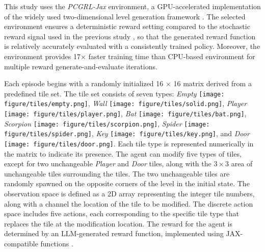
This study uses the \textit{PCGRL-Jax} \cite{earle2024scaling} environment, a GPU-accelerated implementation of the widely used two-dimensional level generation framework \cite{khalifa2020pcgrl,earle2021learning}.
The selected environment ensures a deterministic reward setting compared to the stochastic reward signal used in the previous study \cite{baek2024chatpcg}, so that the generated reward function is relatively accurately evaluated with a consistently trained policy.
Moreover, the environment provides 17$\times$ faster training time than CPU-based environment for multiple reward generate-and-evaluate iterations.

Each episode begins with a randomly initialized 16 $\times{}$ 16 matrix derived from a predefined tile set. The tile set consists of seven types: \textit{Empty} \texttt{[image: figure/tiles/empty.png]}, \textit{Wall} \texttt{[image: figure/tiles/solid.png]}, \textit{Player} \texttt{[image: figure/tiles/player.png]}, \textit{Bat} \texttt{[image: figure/tiles/bat.png]}, \textit{Scorpion} \texttt{[image: figure/tiles/scorpion.png]}, \textit{Spider} \texttt{[image: figure/tiles/spider.png]}, \textit{Key} \texttt{[image: figure/tiles/key.png]}, and \textit{Door} \texttt{[image: figure/tiles/door.png]}. Each tile type is represented numerically in the matrix to indicate its presence.
The agent can modify five types of tiles, except for two unchangeable \textit{Player} and \textit{Door} tiles, along with the $3 \times 3$ area of unchangeable tiles surrounding the tiles.
The two unchangeable tiles are randomly spawned on the opposite corners of the level in the initial state.
The observation space is defined as a 2D array representing the integer tile numbers, along with a channel the location of the tile to be modified.
The discrete action space includes five actions, each corresponding to the specific tile type that replaces the tile at the modification location.
The reward for the agent is determined by an LLM-generated reward function, implemented using JAX-compatible functions \cite{jax2018github}.
